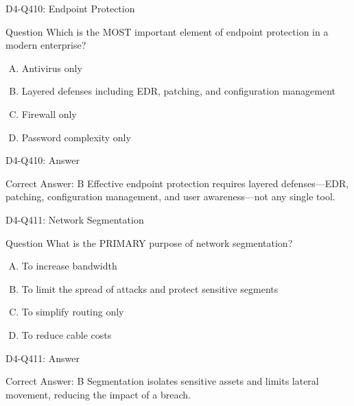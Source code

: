\documentclass{beamer}
\begin{document}
\begin{frame}{D4-Q410: Endpoint Protection}
	\begin{block}{Question}
		Which is the MOST important element of endpoint protection in a modern enterprise?
	\end{block}
	\begin{enumerate}[(A)]
		\item Antivirus only
		\item Layered defenses including EDR, patching, and configuration management
		\item Firewall only
		\item Password complexity only
	\end{enumerate}
\end{frame}
\begin{frame}{D4-Q410: Answer}
	\begin{block}{Correct Answer: B}
		Effective endpoint protection requires layered defenses—EDR, patching, configuration management, and user awareness—not any single tool.
	\end{block}
\end{frame}

\begin{frame}{D4-Q411: Network Segmentation}
	\begin{block}{Question}
		What is the PRIMARY purpose of network segmentation?
	\end{block}
	\begin{enumerate}[(A)]
		\item To increase bandwidth
		\item To limit the spread of attacks and protect sensitive segments
		\item To simplify routing only
		\item To reduce cable costs
	\end{enumerate}
\end{frame}
\begin{frame}{D4-Q411: Answer}
	\begin{block}{Correct Answer: B}
		Segmentation isolates sensitive assets and limits lateral movement, reducing the impact of a breach.
	\end{block}
\end{frame}
\end{document}
